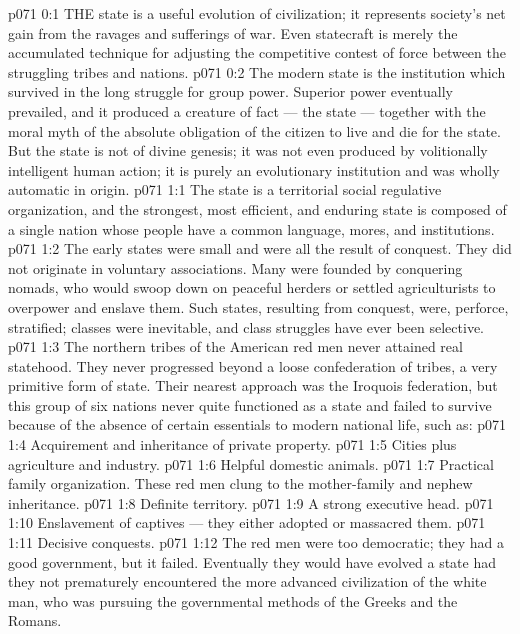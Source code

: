 \vs p071 0:1 THE state is a useful evolution of civilization; it represents society’s net gain from the ravages and sufferings of war. Even statecraft is merely the accumulated technique for adjusting the competitive contest of force between the struggling tribes and nations.
\vs p071 0:2 The modern state is the institution which survived in the long struggle for group power. Superior power eventually prevailed, and it produced a creature of fact --- the state --- together with the moral myth of the absolute obligation of the citizen to live and die for the state. But the state is not of divine genesis; it was not even produced by volitionally intelligent human action; it is purely an evolutionary institution and was wholly automatic in origin.
\vs p071 1:1 The state is a territorial social regulative organization, and the strongest, most efficient, and enduring state is composed of a single nation whose people have a common language, mores, and institutions.
\vs p071 1:2 The early states were small and were all the result of conquest. They did not originate in voluntary associations. Many were founded by conquering nomads, who would swoop down on peaceful herders or settled agriculturists to overpower and enslave them. Such states, resulting from conquest, were, perforce, stratified; classes were inevitable, and class struggles have ever been selective.
\vs p071 1:3 \pc The northern tribes of the American red men never attained real statehood. They never progressed beyond a loose confederation of tribes, a very primitive form of state. Their nearest approach was the Iroquois federation, but this group of six nations never quite functioned as a state and failed to survive because of the absence of certain essentials to modern national life, such as:
\vs p071 1:4 \bibnobreakspace Acquirement and inheritance of private property.
\vs p071 1:5 \bibnobreakspace Cities plus agriculture and industry.
\vs p071 1:6 \bibnobreakspace Helpful domestic animals.
\vs p071 1:7 \bibnobreakspace Practical family organization. These red men clung to the mother\hyp{}family and nephew inheritance.
\vs p071 1:8 \bibnobreakspace Definite territory.
\vs p071 1:9 \bibnobreakspace A strong executive head.
\vs p071 1:10 \bibnobreakspace Enslavement of captives --- they either adopted or massacred them.
\vs p071 1:11 \bibnobreakspace Decisive conquests.
\vs p071 1:12 \pc The red men were too democratic; they had a good government, but it failed. Eventually they would have evolved a state had they not prematurely encountered the more advanced civilization of the white man, who was pursuing the governmental methods of the Greeks and the Romans.
